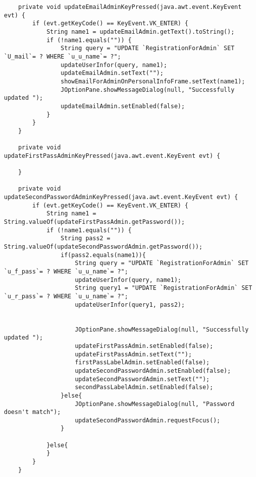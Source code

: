 \documentclass[12pt,a4paper]{article}
\begin{document}
\begin{lstlisting}
    private void updateEmailAdminKeyPressed(java.awt.event.KeyEvent evt) {                                            
        if (evt.getKeyCode() == KeyEvent.VK_ENTER) {
            String name1 = updateEmailAdmin.getText().toString();
            if (!name1.equals("")) {
                String query = "UPDATE `RegistrationForAdmin` SET `U_mail`= ? WHERE `u_u_name`= ?";
                updateUserInfor(query, name1);
                updateEmailAdmin.setText("");
                showEmailForAdminOnPersonalInfoFrame.setText(name1);
                JOptionPane.showMessageDialog(null, "Successfully updated ");
                updateEmailAdmin.setEnabled(false);
            }
        }
    }                                           

    private void updateFirstPassAdminKeyPressed(java.awt.event.KeyEvent evt) {                                                
        
    }                                               

    private void updateSecondPasswordAdminKeyPressed(java.awt.event.KeyEvent evt) {                                                     
        if (evt.getKeyCode() == KeyEvent.VK_ENTER) {
            String name1 = String.valueOf(updateFirstPassAdmin.getPassword());
            if (!name1.equals("")) {
                String pass2 = String.valueOf(updateSecondPasswordAdmin.getPassword());
                if(pass2.equals(name1)){
                    String query = "UPDATE `RegistrationForAdmin` SET `u_f_pass`= ? WHERE `u_u_name`= ?";
                    updateUserInfor(query, name1);
                    String query1 = "UPDATE `RegistrationForAdmin` SET `u_r_pass`= ? WHERE `u_u_name`= ?";
                    updateUserInfor(query1, pass2);
                    
                    
                    JOptionPane.showMessageDialog(null, "Successfully updated ");
                    updateFirstPassAdmin.setEnabled(false);
                    updateFirstPassAdmin.setText("");
                    firstPassLabelAdmin.setEnabled(false);
                    updateSecondPasswordAdmin.setEnabled(false);
                    updateSecondPasswordAdmin.setText("");
                    secondPassLabelAdmin.setEnabled(false);
                }else{
                    JOptionPane.showMessageDialog(null, "Password doesn't match");
                    updateSecondPasswordAdmin.requestFocus();
                }
                
            }else{
            }
        }
    }                                                    
    

\end{lstlisting}
\end{document}
